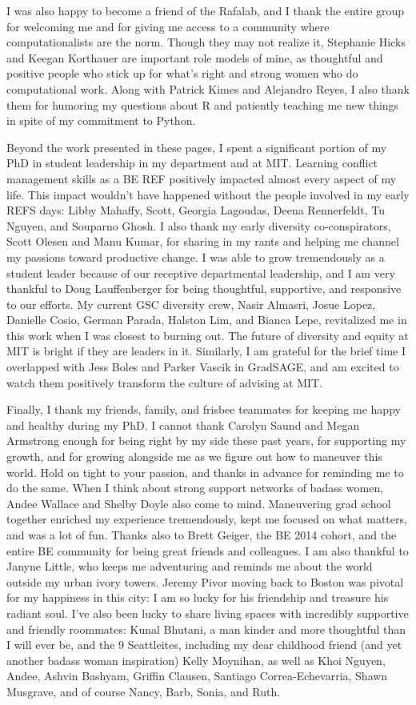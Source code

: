 \begin{singlespace}
I was also happy to become a friend of the Rafalab, and I thank the entire group for welcoming me and for giving me access to a community where computationalists are the norm.
Though they may not realize it, Stephanie Hicks and Keegan Korthauer are important role models of mine, as thoughtful and positive people who stick up for what's right and strong women who do computational work.
Along with Patrick Kimes and Alejandro Reyes, I also thank them for humoring my questions about R and patiently teaching me new things in spite of my commitment to Python.

Beyond the work presented in these pages, I spent a significant portion of my PhD in student leadership in my department and at MIT.
Learning conflict management skills as a BE REF positively impacted almost every aspect of my life.
This impact wouldn't have happened without the people involved in my early REFS days: Libby Mahaffy, Scott, Georgia Lagoudas, Deena Rennerfeldt, Tu Nguyen, and Souparno Ghosh.
I also thank my early diversity co-conspirators, Scott Olesen and Manu Kumar, for sharing in my rants and helping me channel my passions toward productive change.
I was able to grow tremendously as a student leader because of our receptive departmental leadership, and I am very thankful to Doug Lauffenberger for being thoughtful, supportive, and responsive to our efforts.
My current GSC diversity crew, Nasir Almasri, Josue Lopez, Danielle Cosio, German Parada, Halston Lim, and Bianca Lepe, revitalized me in this work when I was closest to burning out.
The future of diversity and equity at MIT is bright if they are leaders in it.
Similarly, I am grateful for the brief time I overlapped with Jess Boles and Parker Vascik in GradSAGE, and am excited to watch them positively transform the culture of advising at MIT.

Finally, I thank my friends, family, and frisbee teammates for keeping me happy and healthy during my PhD.
I cannot thank Carolyn Saund and Megan Armstrong enough for being right by my side these past years, for supporting my growth, and for growing alongside me as we figure out how to maneuver this world.
Hold on tight to your passion, and thanks in advance for reminding me to do the same.
When I think about strong support networks of badass women, Andee Wallace and Shelby Doyle also come to mind.
Maneuvering grad school together enriched my experience tremendously, kept me focused on what matters, and was a lot of fun.
Thanks also to Brett Geiger, the BE 2014 cohort, and the entire BE community for being great friends and colleagues.
I am also thankful to Janyne Little, who keeps me adventuring and reminds me about the world outside my urban ivory towers.
Jeremy Pivor moving back to Boston was pivotal for my happiness in this city: I am so lucky for his friendship and treasure his radiant soul.
I've also been lucky to share living spaces with incredibly supportive and friendly roommates: Kunal Bhutani, a man kinder and more thoughtful than I will ever be, and the 9 Seattleites, including my dear childhood friend (and yet another badass woman inspiration) Kelly Moynihan, as well as Khoi Nguyen, Andee, Ashvin Bashyam, Griffin Clausen, Santiago Correa-Echevarria, Shawn Musgrave, and of course Nancy, Barb, Sonia, and Ruth.


\end{singlespace}
